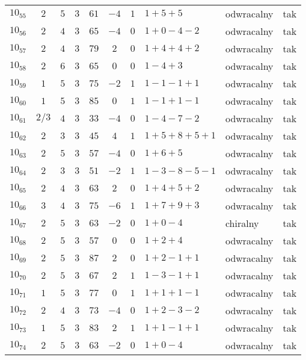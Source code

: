 \begin{longtable}{lccccccllc}
$10_{55}$  & $2$   & $5$ & $3$ & $61$  & $-4$ & $1$ & $1+5+5$       & odwracalny & tak \\
$10_{56}$  & $2$   & $4$ & $3$ & $65$  & $-4$ & $0$ & $1+0-4-2$     & odwracalny & tak \\
$10_{57}$  & $2$   & $4$ & $3$ & $79$  & $2$  & $0$ & $1+4+4+2$     & odwracalny & tak \\
$10_{58}$  & $2$   & $6$ & $3$ & $65$  & $0$  & $0$ & $1-4+3$       & odwracalny & tak \\
$10_{59}$  & $1$   & $5$ & $3$ & $75$  & $-2$ & $1$ & $1-1-1+1$     & odwracalny & tak \\
$10_{60}$  & $1$   & $5$ & $3$ & $85$  & $0$  & $1$ & $1-1+1-1$     & odwracalny & tak \\
$10_{61}$  & $2/3$ & $4$ & $3$ & $33$  & $-4$ & $0$ & $1-4-7-2$     & odwracalny & tak \\
$10_{62}$  & $2$   & $3$ & $3$ & $45$  & $4$  & $1$ & $1+5+8+5+1$   & odwracalny & tak \\
$10_{63}$  & $2$   & $5$ & $3$ & $57$  & $-4$ & $0$ & $1+6+5$       & odwracalny & tak \\
$10_{64}$  & $2$   & $3$ & $3$ & $51$  & $-2$ & $1$ & $1-3-8-5-1$   & odwracalny & tak \\
$10_{65}$  & $2$   & $4$ & $3$ & $63$  & $2$  & $0$ & $1+4+5+2$     & odwracalny & tak \\
$10_{66}$  & $3$   & $4$ & $3$ & $75$  & $-6$ & $1$ & $1+7+9+3$     & odwracalny & tak \\
$10_{67}$  & $2$   & $5$ & $3$ & $63$  & $-2$ & $0$ & $1+0-4$       & chiralny   & tak \\
$10_{68}$  & $2$   & $5$ & $3$ & $57$  & $0$  & $0$ & $1+2+4$       & odwracalny & tak \\
$10_{69}$  & $2$   & $5$ & $3$ & $87$  & $2$  & $0$ & $1+2-1+1$     & odwracalny & tak \\
$10_{70}$  & $2$   & $5$ & $3$ & $67$  & $2$  & $1$ & $1-3-1+1$     & odwracalny & tak \\
$10_{71}$  & $1$   & $5$ & $3$ & $77$  & $0$  & $1$ & $1+1+1-1$     & odwracalny & tak \\
$10_{72}$  & $2$   & $4$ & $3$ & $73$  & $-4$ & $0$ & $1+2-3-2$     & odwracalny & tak \\
$10_{73}$  & $1$   & $5$ & $3$ & $83$  & $2$  & $1$ & $1+1-1+1$     & odwracalny & tak \\
$10_{74}$  & $2$   & $5$ & $3$ & $63$  & $-2$ & $0$ & $1+0-4$       & odwracalny & tak \\

\end{longtable}
